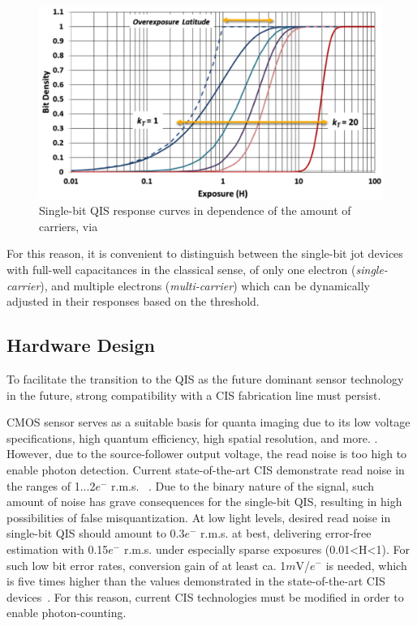 \begin{figure}[h]
  \centering
  \includegraphics[width=\linewidth]{imgs/qis/multicarrier.png}
  \caption{Single-bit QIS response curves in dependence of the amount of carriers, via \cite{FossumSiMulQIS}}
  \label{fig:qiskt}
\end{figure}

For this reason, it is convenient to distinguish between the single-bit jot devices with full-well capacitances in the classical sense, of only one electron (\textit{single-carrier}), and multiple electrons (\textit{multi-carrier}) which can be dynamically adjusted in their responses based on the threshold.

\subsection{Hardware Design}

To facilitate the transition to the QIS as the future dominant sensor technology in the future, strong compatibility with a CIS fabrication line must persist.

CMOS sensor serves as a suitable basis for quanta imaging due to its low voltage specifications, high quantum efficiency, high spatial resolution, and more. \cite{Ma:17}. 
However, due to the source-follower output voltage, the read noise is too high to enable photon detection. Current state-of-the-art CIS demonstrate read noise in the ranges of 1...2$e^{-}$ r.m.s. ~\cite{7273747}. Due to the binary nature of the signal, such amount of noise has grave consequences for the single-bit QIS, resulting in high possibilities of false misquantization. At low light levels, desired read noise in single-bit QIS should amount to 0.3$e^{-}$ r.m.s. at best, delivering error-free estimation with 0.15$e^{-}$ r.m.s. under especially sparse exposures (0.01<H<1). For such low bit error rates, conversion gain of at least ca. 1$m$V/$e^{-}$ is needed, which is five times higher than the values demonstrated in the state-of-the-art CIS devices~\cite{MaJotDevices}.
For this reason, current CIS technologies must be modified in order to enable photon-counting.

